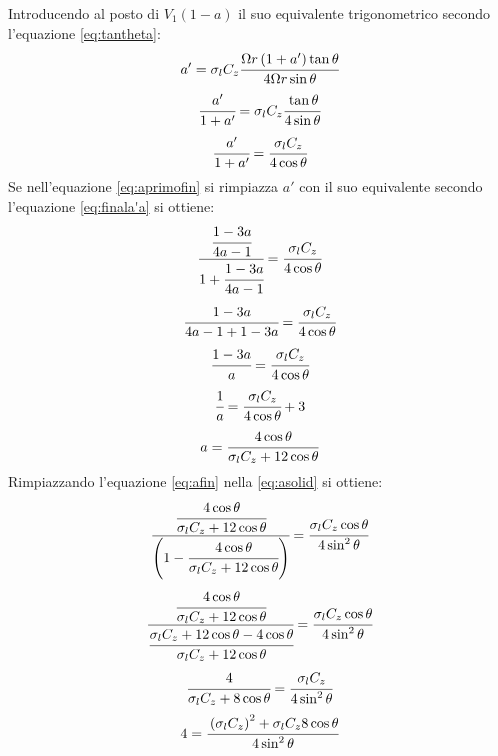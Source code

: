 Introducendo al posto di $V_1 \left(1-a\right)$ il suo equivalente trigonometrico secondo l'equazione \ref{eq:tantheta}:
\begin{align*}
a' = \sigma_l C_z \cfrac{\Omega r \left(1+a' \right) \tan \theta}{4 \Omega r \sin \theta}
\end{align*}
\begin{align*}
\cfrac{a'}{1+a'} = \sigma_l C_z \cfrac{\tan \theta}{4 \sin \theta}
\end{align*}
\begin{equation}\label{eq:aprimofin}
\cfrac{a'}{1+a'} = \cfrac{\sigma_l C_z}{4 \cos \theta}
\end{equation}
Se nell'equazione \ref{eq:aprimofin} si rimpiazza $a'$ con il suo equivalente secondo l'equazione \ref{eq:finala'a} si ottiene:
\begin{align*}
\cfrac{\cfrac{1-3a}{4a-1}}{1+\cfrac{1-3a}{4a-1}} = \cfrac{\sigma_l C_z}{4 \cos \theta}
\end{align*}
\begin{align*}
\cfrac{1-3a}{4a-1+1-3a} = \cfrac{\sigma_l C_z}{4 \cos \theta}
\end{align*}
\begin{align*}
\cfrac{1-3a}{a} = \cfrac{\sigma_l C_z }{4 \cos \theta}
\end{align*}
\begin{align*}
\cfrac{1}{a} = \cfrac{\sigma_l C_z}{4 \cos \theta} + 3
\end{align*}
\begin{equation}\label{eq:afin}
a = \cfrac{4 \cos \theta}{\sigma_l C_z +12 \cos \theta}
\end{equation}
Rimpiazzando l'equazione \ref{eq:afin} nella \ref{eq:asolid} si ottiene:
\begin{align*}
\cfrac{\cfrac{4 \cos \theta}{\sigma_l C_z + 12 \cos \theta}}{\left( 1- \cfrac{4 \cos \theta}{\sigma_l C_z + 12 \cos \theta} \right)} = \cfrac{\sigma_l C_z \cos \theta}{4 \sin^2 \theta}
\end{align*}
\begin{align*}
\cfrac{\cfrac{4 \cos \theta}{\sigma_l C_z + 12 \cos \theta}}{\cfrac{\sigma_l C_z + 12 \cos \theta - 4 \cos \theta}{\sigma_l C_z + 12 \cos \theta}} = \cfrac{\sigma_l C_z \cos\theta}{4 \sin^2 \theta}
\end{align*}
\begin{align*}
\cfrac{4}{\sigma_l C_z + 8 \cos \theta} = \cfrac{\sigma_l C_z}{4 \sin^2 \theta}
\end{align*}
\begin{align*}
4 = \cfrac{\left( \sigma_l C_z \right)^2 + \sigma_l C_z 8 \cos \theta}{4 \sin^2 \theta}
\end{align*}
